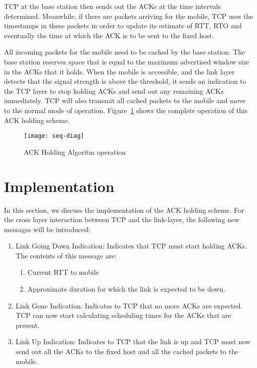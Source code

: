 \documentclass[conference]{IEEEtran}
\begin{document}
\noindent TCP at the base station then sends out the ACKs at the time intervals determined. Meanwhile, if there are packets arriving for the mobile, TCP uses the timestamps in these packets in order to update its estimate of RTT, RTO and eventually the time at which the ACK is to be sent to the fixed host. 

All incoming packets for the mobile need to be cached by the base station. The base station reserves space that is equal to the maximum advertised window size in the ACKs that it holds. When the mobile is accessible, and the link layer detects that the signal strength is above the threshold, it sends an indication to the TCP layer to stop holding ACKs and send out any remaining ACKs immediately. TCP will also transmit all cached packets to the mobile and move to the normal mode of operation. Figure~\ref{fig:seq-diag} shows the complete operation of this ACK holding scheme.

\begin{figure}
  \centering
  \texttt{[image: seq-diag]}
  \caption{ACK Holding Algoritm operation}
  \label{fig:seq-diag}
\end{figure}

\section{Implementation}
\label{sec:implementation}
In this section, we discuss the implementation of the ACK holding scheme. For the cross layer interaction between TCP and the link-layer, the following new messages will be introduced:
\begin{enumerate}
\item Link Going Down Indication: Indicates that TCP must start holding ACKs. The contents of this message are:
  \begin{enumerate}
  \item Current RTT to mobile
  \item Approximate duration for which the link is expected to be down.
  \end{enumerate}
\item Link Gone Indication: Indicates to TCP that no more ACKs are expected. TCP can now start calculating scheduling times for the ACKs that are present. 
\item Link Up Indication: Indicates to TCP that the link is up and TCP must now send out all the ACKs to the fixed host and all the cached packets to the mobile.
\end{enumerate}
\end{document}
